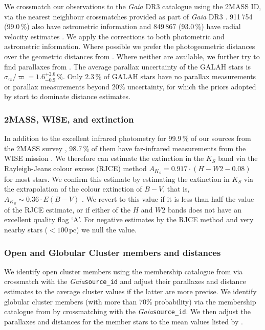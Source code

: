 \documentclass[
  journal=pasa,
  manuscript=research-paper, %
  year=2024,
  volume=37
]{cup-journal}
\newcommand{\Gaia}{\textit{Gaia}\xspace}
\begin{document}
We crossmatch our observations to the \Gaia DR3 catalogue \citep{Brown2021,GaiaDR3} using the 2MASS ID, via the nearest neighbour crossmatches provided as part of \Gaia DR3 \citep{Torra2021}. 
911\,754 (99.0\,\%) also have astrometric information \citep{Lindegren2021a} and 849\,867 (93.0\,\%) have radial velocity estimates \citep{Katz2023}. We apply the corrections to both photometric \citep{Riello2021} and astrometric \citep{Lindegren2021b} information. Where possible we prefer the photogeometric distances over the geometric distances from \citet{BailerJones2021}. Where neither are available, we further try to find parallaxes from \cite{vanLeeuwen2007}. The average parallax uncertainty of the GALAH stars is $\sigma_{\varpi} / \varpi = 1.6_{-0.9}^{+2.6}\,\mathrm{\%}$. Only $2.3\,\%$ of GALAH stars have no parallax measurements or parallax measurements beyond $20\%$ uncertainty, for which the priors adopted by \citet{BailerJones2021} start to dominate distance estimates.

\subsubsection{2MASS, WISE, and extinction}

In addition to the excellent infrared photometry for 99.9\,\% of our sources from the 2MASS survey \citep{Skrutskie2006}, 98.7\,\% of them have far-infrared measurements from the WISE mission \citep{Cutri2013}. We therefore can estimate the extinction in the $K_S$ band via the Rayleigh-Jeans colour excess (RJCE) method \citep{Majewski2011} $A_{K_S}  = 0.917 \cdot \left( H - W2 - 0.08 \right)$ for most stars. We confirm this estimate by estimating the extinction in $K_S$ via the extrapolation of the colour extinction of $B-V$, that is, $A_{K_S} \sim 0.36 \cdot E(B-V)$ \citep{Cardelli1989}. We revert to this value if it is less than half the value of the RJCE estimate, or if either of the $H$ and $W2$ bands does not have an excellent quality flag `A'. For negative estimates by the RJCE method and very nearby stars ($<100\,\mathrm{pc}$) we null the value.

\subsubsection{Open and Globular Cluster members and distances} \label{sec:oc_gc}

We identify open cluster members using the membership catalogue from \citet{CantatGaudin2020} via crossmatch with the \Gaia \texttt{source\_id} and adjust their parallaxes and distance estimates to the average cluster values if the latter are more precise. We identify globular cluster members (with more than 70\% probability) via the membership catalogue from \citet{Vasiliev2021} by crossmatching with the \Gaia \texttt{source\_id}. We then adjust the parallaxes and distances for the member stars to the mean values listed by \citet{Baumgardt2021}.
\end{document}
